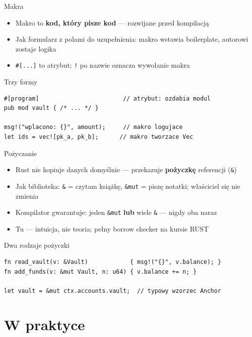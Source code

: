 \begin{frame}[fragile]{Makra}
  \begin{itemize}
    \item Makro to \textbf{kod, który pisze kod} --- rozwijane przed kompilacją
    \item Jak formularz z polami do uzupełnienia: makro wstawia boilerplate, autorowi zostaje logika
    \item \texttt{\#[...]} to atrybut; \texttt{!} po nazwie oznacza wywołanie makra
  \end{itemize}
  \begin{exampleblock}{Trzy formy}
\begin{lstlisting}
#[program]                        // atrybut: ozdabia modul
pub mod vault { /* ... */ }

msg!("wplacono: {}", amount);     // makro logujace
let ids = vec![pk_a, pk_b];      // makro tworzace Vec
\end{lstlisting}
  \end{exampleblock}
\end{frame}

\begin{frame}[fragile]{Pożyczanie}
  \begin{itemize}
    \item Rust nie kopiuje danych domyślnie --- przekazuje \textbf{pożyczkę} referencji (\texttt{\&})
    \item Jak biblioteka: \texttt{\&} = czytam książkę, \texttt{\&mut} = piszę notatki; właściciel się nie zmienia
    \item Kompilator gwarantuje: jeden \texttt{\&mut} \textbf{lub} wiele \texttt{\&} --- nigdy oba naraz
    \item \textcolor{stplmuted}{Tu --- intuicja, nie teoria; pełny borrow checker na kursie RUST}
  \end{itemize}
  \begin{block}{Dwa rodzaje pożyczki}
\begin{lstlisting}
fn read_vault(v: &Vault)            { msg!("{}", v.balance); }
fn add_funds(v: &mut Vault, n: u64) { v.balance += n; }

let vault = &mut ctx.accounts.vault;  // typowy wzorzec Anchor
\end{lstlisting}
  \end{block}
\end{frame}

\section{W praktyce}

